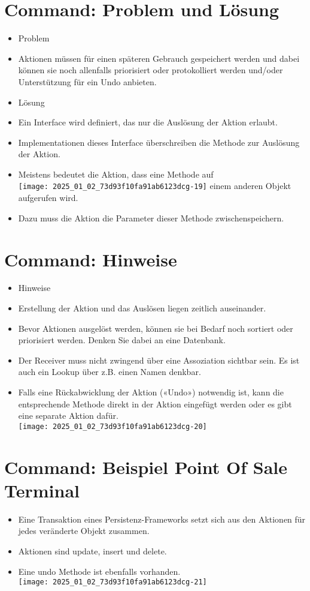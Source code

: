 \section*{Command: Problem und Lösung}
\begin{itemize}
  \item Problem
  \item Aktionen müssen für einen späteren Gebrauch gespeichert werden und dabei können sie noch allenfalls priorisiert oder protokolliert werden und/oder Unterstützung für ein Undo anbieten.
  \item Lösung
  \item Ein Interface wird definiert, das nur die Auslösung der Aktion erlaubt.
  \item Implementationen dieses Interface überschreiben die Methode zur Auslösung der Aktion.
  \item Meistens bedeutet die Aktion, dass eine Methode auf\\
\texttt{[image: 2025\_01\_02\_73d93f10fa91ab6123dcg-19]} einem anderen Objekt aufgerufen wird.
  \item Dazu muss die Aktion die Parameter dieser Methode zwischenspeichern.
\end{itemize}

\section*{Command: Hinweise}
\begin{itemize}
  \item Hinweise
  \item Erstellung der Aktion und das Auslösen liegen zeitlich auseinander.
  \item Bevor Aktionen ausgelöst werden, können sie bei Bedarf noch sortiert oder priorisiert werden. Denken Sie dabei an eine Datenbank.
  \item Der Receiver muss nicht zwingend über eine Assoziation sichtbar sein. Es ist auch ein Lookup über z.B. einen Namen denkbar.
  \item Falls eine Rückabwicklung der Aktion («Undo») notwendig ist, kann die entsprechende Methode direkt in der Aktion eingefügt werden oder es gibt eine separate Aktion dafür.\\
\texttt{[image: 2025\_01\_02\_73d93f10fa91ab6123dcg-20]}
\end{itemize}

\section*{Command: Beispiel Point Of Sale Terminal}
\begin{itemize}
  \item Eine Transaktion eines Persistenz-Frameworks setzt sich aus den Aktionen für jedes veränderte Objekt zusammen.
  \item Aktionen sind update, insert und delete.
  \item Eine undo Methode ist ebenfalls vorhanden.\\
\texttt{[image: 2025\_01\_02\_73d93f10fa91ab6123dcg-21]}
\end{itemize}

